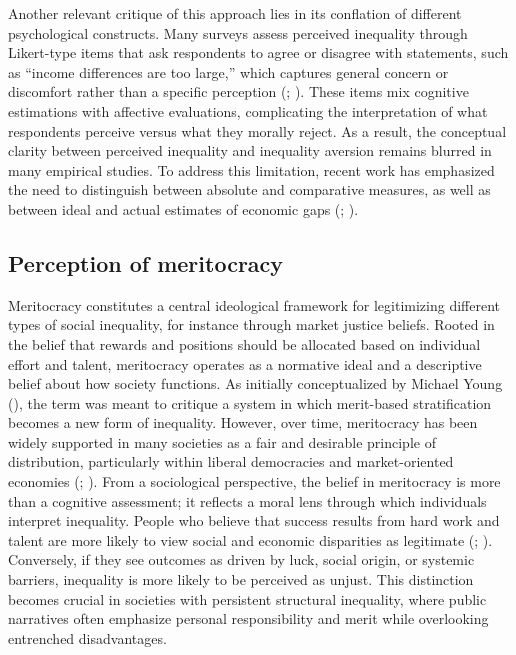 \documentclass[
  12pt,
]{article}
\begin{document}
Another relevant critique of this approach lies in its conflation of
different psychological constructs. Many surveys assess perceived
inequality through Likert-type items that ask respondents to agree or
disagree with statements, such as ``income differences are too large,''
which captures general concern or discomfort rather than a specific
perception (;
). These items mix cognitive estimations with affective
evaluations, complicating the interpretation of what respondents
perceive versus what they morally reject. As a result, the conceptual
clarity between perceived inequality and inequality aversion remains
blurred in many empirical studies. To address this limitation, recent
work has emphasized the need to distinguish between absolute and
comparative measures, as well as between ideal and actual estimates of
economic gaps (;
).

\subsection{Perception of meritocracy}\label{perception-of-meritocracy}

Meritocracy constitutes a central ideological framework for legitimizing
different types of social inequality, for instance through market
justice beliefs. Rooted in the belief that rewards and positions should
be allocated based on individual effort and talent, meritocracy operates
as a normative ideal and a descriptive belief about how society
functions. As initially conceptualized by Michael Young
(), the term was meant to critique a
system in which merit-based stratification becomes a new form of
inequality. However, over time, meritocracy has been widely supported in
many societies as a fair and desirable principle of distribution,
particularly within liberal democracies and market-oriented economies
(;
). From a sociological
perspective, the belief in meritocracy is more than a cognitive
assessment; it reflects a moral lens through which individuals interpret
inequality. People who believe that success results from hard work and
talent are more likely to view social and economic disparities as
legitimate (;
).
Conversely, if they see outcomes as driven by luck, social origin, or
systemic barriers, inequality is more likely to be perceived as unjust.
This distinction becomes crucial in societies with persistent structural
inequality, where public narratives often emphasize personal
responsibility and merit while overlooking entrenched disadvantages.
\end{document}
